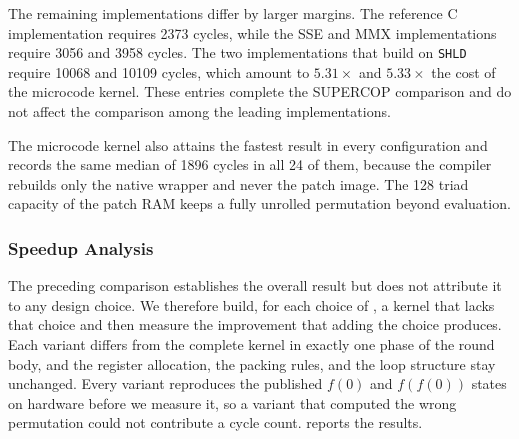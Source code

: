 \documentclass[journal=tches,submission]{iacrtrans}
\newcommand{\code}[1]{\texttt{#1}}
\begin{document}
The remaining implementations differ by larger margins.
The reference C implementation requires 2373 cycles, while the SSE and MMX implementations require 3056 and 3958 cycles.
The two implementations that build on \code{SHLD} require 10068 and 10109 cycles, which amount to $5.31\times$ and $5.33\times$ the cost of the microcode kernel.
These entries complete the SUPERCOP comparison and do not affect the comparison among the leading implementations.

The microcode kernel also attains the fastest result in every configuration and records the same median of 1896 cycles in all 24 of them, because the compiler rebuilds only the native wrapper and never the patch image.
The 128 triad capacity of the patch RAM keeps a fully unrolled permutation beyond evaluation.

\subsubsection{Speedup Analysis}
\label{sec:keccak-analysis}

The preceding comparison establishes the overall result but does not attribute it to any design choice.
We therefore build, for each choice of , a kernel that lacks that choice and then measure the improvement that adding the choice produces.
Each variant differs from the complete kernel in exactly one phase of the round body, and the register allocation, the packing rules, and the loop structure stay unchanged.
Every variant reproduces the published $f(0)$ and $f(f(0))$ states on hardware before we measure it, so a variant that computed the wrong permutation could not contribute a cycle count.
 reports the results.
\end{document}
